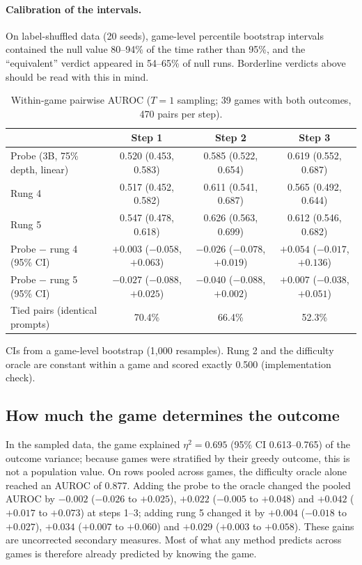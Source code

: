 \documentclass[11pt]{article}
\begin{document}
\paragraph{Calibration of the intervals.} On label-shuffled data (20 seeds), game-level percentile bootstrap intervals contained the null value 80--94\% of the time rather than 95\%,
and the ``equivalent'' verdict appeared in 54--65\% of null runs. Borderline verdicts above should be read with this in mind.

\begin{table}[t]
\centering\small
\caption{Within-game pairwise AUROC ($T = 1$ sampling; 39 games with both outcomes, 470 pairs per step).}\label{tab:within}
\begin{tabularx}{\linewidth}{@{}Lccc@{}}
\toprule
 & Step 1 & Step 2 & Step 3 \\
\midrule
Probe (3B, 75\% depth, linear) & 0.520 (0.453, 0.583) & 0.585 (0.522, 0.654) & 0.619 (0.552, 0.687) \\
Rung 4 & 0.517 (0.452, 0.582) & 0.611 (0.541, 0.687) & 0.565 (0.492, 0.644) \\
Rung 5 & 0.547 (0.478, 0.618) & 0.626 (0.563, 0.699) & 0.612 (0.546, 0.682) \\
Probe $-$ rung 4 (95\% CI) & $+0.003$ ($-0.058$, $+0.063$) & $-0.026$ ($-0.078$, $+0.019$) & $+0.054$ ($-0.017$, $+0.136$) \\
Probe $-$ rung 5 (95\% CI) & $-0.027$ ($-0.088$, $+0.025$) & $-0.040$ ($-0.088$, $+0.002$) & $+0.007$ ($-0.038$, $+0.051$) \\
Tied pairs (identical prompts) & 70.4\% & 66.4\% & 52.3\% \\
\bottomrule
\end{tabularx}
\par\smallskip\raggedright\footnotesize
CIs from a game-level bootstrap (1,000 resamples). Rung 2 and the difficulty oracle are constant within a game and scored exactly 0.500 (implementation check).
\end{table}

\subsection{How much the game determines the outcome}
In the sampled data, the game explained $\eta^2 = 0.695$ (95\% CI 0.613--0.765) of the outcome variance; because games were stratified by their greedy outcome, this is not a population value.
On rows pooled across games, the difficulty oracle alone reached an AUROC of 0.877. Adding the probe to the oracle changed the pooled AUROC by $-0.002$ ($-0.026$ to $+0.025$), $+0.022$ ($-0.005$ to $+0.048$)
and $+0.042$ ($+0.017$ to $+0.073$) at steps 1--3; adding rung 5 changed it by $+0.004$ ($-0.018$ to $+0.027$), $+0.034$ ($+0.007$ to $+0.060$) and $+0.029$ ($+0.003$ to $+0.058$). These gains are uncorrected secondary measures.
Most of what any method predicts across games is therefore already predicted by knowing the game.
\end{document}

